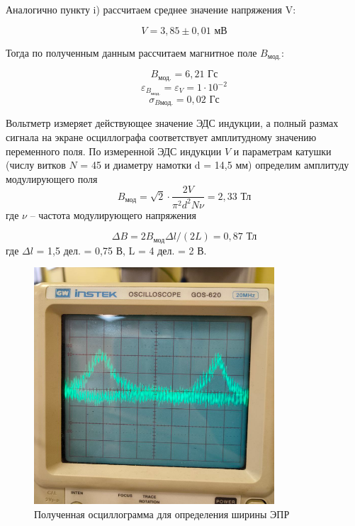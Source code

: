 \documentclass[a4paper, 12pt]{article}%
\begin{document}
\begin{enumerate}
		Аналогично пункту i) рассчитаем среднее значение напряжения V:
		
		$$ V = 3,85 \pm 0,01 \text{ мВ} $$
		
		Тогда по полученным данным рассчитаем магнитное поле $B_{\text{мод.}}$:
		
		$$ B_{\text{мод.}}= 6,21 \text{ Гс} $$
		$$ \varepsilon_{B_{\text{мод.}}} = \varepsilon_V  = 1 \cdot 10^{-2} $$
		$$ \sigma_{B{\text{мод.}}} = 0,02 \text{ Гс}$$
		
		  Вольтметр измеряет действующее значение ЭДС индукции, а полный размах сигнала на экране осциллографа соответствует амплитудному значению переменного поля. По измеренной ЭДС индукции $V$ и параметрам катушки (числу витков $N$ = 45 и диаметру
		намотки d = 14,5 мм) определим амплитуду модулирующего поля 
		$$ B_{\text{мод}} = \sqrt{2} \cdot \frac{2V}{\pi^2 d^2 N \nu} = 2,33 \text{ Тл}$$ 
		где $\nu$ --
		частота модулирующего напряжения
		
		$$ \Delta B = 2 B_{\text{мод}}  \Delta l / (2L) = 0,87 \text{ Тл}$$
		где $\Delta l $ = 1,5 дел. = 0,75 В, L = 4 дел. = 2 В.
		
			\begin{figure}[H]
			\begin{center}
				\includegraphics[width = 0.8\textwidth]{pict}
				\caption{Полученная осциллограмма для определения ширины ЭПР}
			\end{center}
		\end{figure}
		
		
		
		
		

\end{enumerate}
\end{document}
